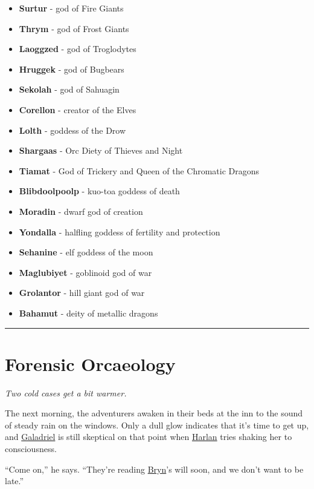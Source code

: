 \documentclass[smalldemyvopaper,11pt,twoside,onecolumn,openright,extrafontsizes]{memoir}
\newcommand{\chapdesc}[1]{
    \begin{flushright}
    \emph{{#1}}
    \end{flushright}
    \vspace{26pt}
}
\begin{document}
\begin{itemize}
\tightlist
\item
  \textbf{Surtur} - god of Fire Giants
\item
  \textbf{Thrym} - god of Frost Giants
\item
  \textbf{Laoggzed} - god of Troglodytes
\item
  \textbf{Hruggek} - god of Bugbears
\item
  \textbf{Sekolah} - god of Sahuagin
\item
  \textbf{Corellon} - creator of the Elves
\item
  \textbf{Lolth} - goddess of the Drow
\item
  \textbf{Shargaas} - Orc Diety of Thieves and Night
\item
  \textbf{Tiamat} - God of Trickery and Queen of the Chromatic Dragons
\item
  \textbf{Blibdoolpoolp} - kuo-toa goddess of death
\item
  \textbf{Moradin} - dwarf god of creation
\item
  \textbf{Yondalla} - halfling goddess of fertility and protection
\item
  \textbf{Sehanine} - elf goddess of the moon
\item
  \textbf{Maglubiyet} - goblinoid god of war
\item
  \textbf{Grolantor} - hill giant god of war
\item
  \textbf{Bahamut} - deity of metallic dragons
\end{itemize}

\begin{center}\rule{0.5\linewidth}{\linethickness}\end{center}


\chapter{Forensic Orcaeology}
\chapdesc{Two cold cases get a bit warmer.}

The next morning, the adventurers awaken in their beds at the inn to the
sound of steady rain on the windows. Only a dull glow indicates that
it's time to get up, and \href{/characters/galadriel/}{Galadriel} is
still skeptical on that point when \href{/characters/harlan/}{Harlan}
tries shaking her to consciousness.

``Come on,'' he says. ``They're reading \href{/characters/bryn/}{Bryn}'s
will soon, and we don't want to be late.''
\end{document}
